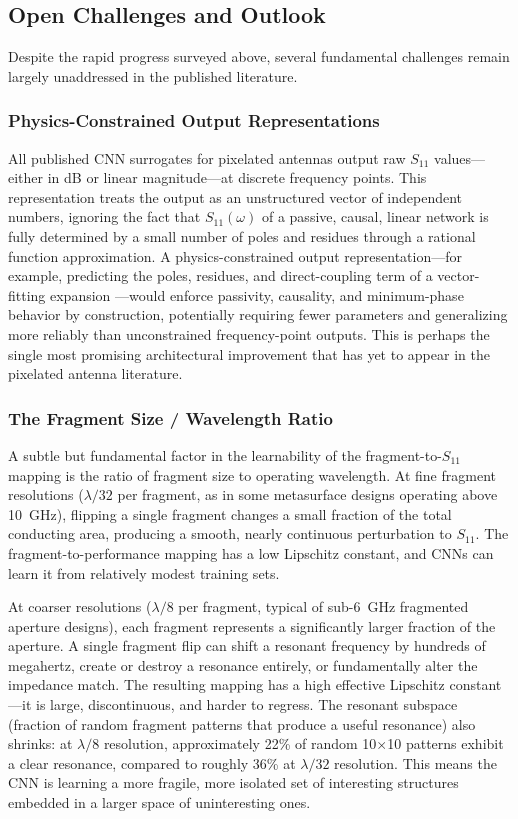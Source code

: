 \subsection{Open Challenges and Outlook}

Despite the rapid progress surveyed above, several fundamental challenges remain largely unaddressed in the published literature.

\subsubsection{Physics-Constrained Output Representations}

All published CNN surrogates for pixelated antennas output raw $S_{11}$ values---either in dB or linear magnitude---at discrete frequency points.  This representation treats the output as an unstructured vector of independent numbers, ignoring the fact that $S_{11}(\omega)$ of a passive, causal, linear network is fully determined by a small number of poles and residues through a rational function approximation.  A physics-constrained output representation---for example, predicting the poles, residues, and direct-coupling term of a vector-fitting expansion \cite{Gustavsen1999VectorFitting}---would enforce passivity, causality, and minimum-phase behavior by construction, potentially requiring fewer parameters and generalizing more reliably than unconstrained frequency-point outputs.  This is perhaps the single most promising architectural improvement that has yet to appear in the pixelated antenna literature.

\subsubsection{The Fragment Size / Wavelength Ratio}

A subtle but fundamental factor in the learnability of the fragment-to-$S_{11}$ mapping is the ratio of fragment size to operating wavelength.  At fine fragment resolutions ($\lambda/32$ per fragment, as in some metasurface designs operating above 10~GHz), flipping a single fragment changes a small fraction of the total conducting area, producing a smooth, nearly continuous perturbation to $S_{11}$.  The fragment-to-performance mapping has a low Lipschitz constant, and CNNs can learn it from relatively modest training sets.

At coarser resolutions ($\lambda/8$ per fragment, typical of sub-6~GHz fragmented aperture designs), each fragment represents a significantly larger fraction of the aperture.  A single fragment flip can shift a resonant frequency by hundreds of megahertz, create or destroy a resonance entirely, or fundamentally alter the impedance match.  The resulting mapping has a high effective Lipschitz constant---it is large, discontinuous, and harder to regress.  The resonant subspace (fraction of random fragment patterns that produce a useful resonance) also shrinks: at $\lambda/8$ resolution, approximately 22\% of random 10$\times$10 patterns exhibit a clear resonance, compared to roughly 36\% at $\lambda/32$ resolution.  This means the CNN is learning a more fragile, more isolated set of interesting structures embedded in a larger space of uninteresting ones.

